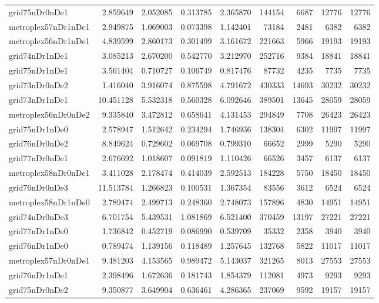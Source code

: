 \begin{longtable}{|l|r|r|r|r|r|r|r|r|}
grid75nDr0nDe1 & 2.859649 & 2.052085 & 0.313785 & 2.365870 & 144154 & 6687 & 12776 & 12776 \\
metroplex57nDr1nDe1 & 2.949875 & 1.069003 & 0.073398 & 1.142401 & 73184 & 2481 & 6382 & 6382 \\
metroplex56nDr1nDe1 & 4.839599 & 2.860173 & 0.301499 & 3.161672 & 221663 & 5966 & 19193 & 19193 \\
grid74nDr1nDe1 & 3.085213 & 2.670200 & 0.542770 & 3.212970 & 252716 & 9384 & 18841 & 18841 \\
grid75nDr1nDe1 & 3.561404 & 0.710727 & 0.106749 & 0.817476 & 87732 & 4235 & 7735 & 7735 \\
grid73nDr0nDe2 & 1.416040 & 3.916074 & 0.875598 & 4.791672 & 430333 & 14693 & 30232 & 30232 \\
grid73nDr1nDe1 & 10.451128 & 5.532318 & 0.560328 & 6.092646 & 389501 & 13645 & 28059 & 28059 \\
metroplex56nDr0nDe2 & 9.335840 & 3.472812 & 0.658641 & 4.131453 & 294849 & 7708 & 26423 & 26423 \\
grid75nDr1nDe0 & 2.578947 & 1.512642 & 0.234294 & 1.746936 & 138304 & 6302 & 11997 & 11997 \\
grid76nDr0nDe2 & 8.849624 & 0.729602 & 0.069708 & 0.799310 & 66652 & 2999 & 5290 & 5290 \\
grid77nDr0nDe1 & 2.676692 & 1.018607 & 0.091819 & 1.110426 & 66526 & 3457 & 6137 & 6137 \\
metroplex58nDr0nDe1 & 3.411028 & 2.178474 & 0.414039 & 2.592513 & 184228 & 5750 & 18450 & 18450 \\
grid76nDr0nDe3 & 11.513784 & 1.266823 & 0.100531 & 1.367354 & 83556 & 3612 & 6524 & 6524 \\
metroplex58nDr1nDe0 & 2.789474 & 2.499713 & 0.248360 & 2.748073 & 157896 & 4830 & 14951 & 14951 \\
grid74nDr0nDe3 & 6.701754 & 5.439531 & 1.081869 & 6.521400 & 370459 & 13197 & 27221 & 27221 \\
grid77nDr1nDe0 & 1.736842 & 0.452719 & 0.086990 & 0.539709 & 35332 & 2358 & 3940 & 3940 \\
grid76nDr1nDe0 & 0.789474 & 1.139156 & 0.118489 & 1.257645 & 132768 & 5822 & 11017 & 11017 \\
metroplex57nDr0nDe1 & 9.481203 & 4.153565 & 0.989472 & 5.143037 & 321265 & 8013 & 27553 & 27553 \\
grid76nDr1nDe1 & 2.398496 & 1.672636 & 0.181743 & 1.854379 & 112081 & 4973 & 9293 & 9293 \\
grid75nDr0nDe2 & 9.350877 & 3.649904 & 0.636461 & 4.286365 & 237069 & 9592 & 19157 & 19157 \\

\end{longtable}
